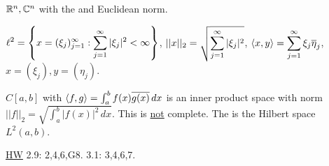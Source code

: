 \documentclass[]{article}
\begin{document}
\begin{example}
	$\mathbb{R}^n,\mathbb{C}^n$ with the  and Euclidean norm.
\end{example}
\newpage
\begin{example}
	$\displaystyle \ell^2 = \left\{ x = (\xi_j)_{j=1}^\infty : \sum_{j=1}^\infty |\xi_j|^2<\infty \right\}$, 
	$\displaystyle ||x||_2 = \sqrt{\sum_{j=1}^\infty |\xi_j|^2}$, 
	$\displaystyle \langle x,y \rangle = \sum_{j=1}^\infty \xi_j\overline{\eta}_j$,
	$x=(\xi_j),y=(\eta_j)$. %
\end{example}
\begin{example}
	$C[a,b]$ with $\langle f,g \rangle = \int_a^b f(x)\overline{g(x)}\,dx$ is an inner product space with  norm $||f||_2 = \sqrt{\int_a^b |f(x)|^2\,dx}$. This is \ul{not} complete.
	The  is the Hilbert space $L^2(a,b)$.
\end{example}
\ul{HW} 2.9: 2,4,6,G8. 3.1: 3,4,6,7.
\end{document}
